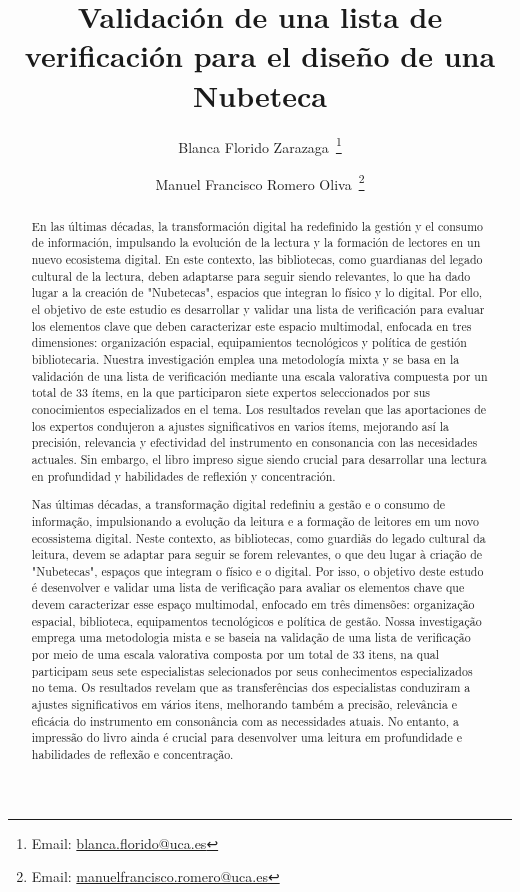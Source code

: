 \documentclass[spanish]{textolivre}
\title{Validación de una lista de verificación para el diseño de una Nubeteca}
\author[1]{Blanca Florido Zarazaga~\orcid{0000-0003-0865-380X}\thanks{Email: \href{mailto:blanca.florido@uca.es}{blanca.florido@uca.es}}}
\author[1]{Manuel Francisco Romero Oliva~\orcid{0000-0002-6854-0682}\thanks{Email: \href{mailto:manuelfrancisco.romero@uca.es}{manuelfrancisco.romero@uca.es}}}
\affil[1]{Universidad de Cádiz, Facultad de Ciencias de la Educación, Departamento de Didáctica de la Lengua y la Literatura, Cádiz, España.}
\begin{document}
\maketitle
\begin{polyabstract}
\begin{abstract}
En las últimas décadas, la transformación digital ha redefinido la gestión y el consumo de información, impulsando la evolución de la lectura y la formación de lectores en un nuevo ecosistema digital. En este contexto, las bibliotecas, como guardianas del legado cultural de la lectura, deben adaptarse para seguir siendo relevantes, lo que ha dado lugar a la creación de "Nubetecas", espacios que integran lo físico y lo digital. Por ello, el objetivo de este estudio es desarrollar y validar una lista de verificación para evaluar los elementos clave que deben caracterizar este espacio multimodal, enfocada en tres dimensiones: organización espacial, equipamientos tecnológicos y política de gestión bibliotecaria. Nuestra investigación emplea una metodología mixta y se basa en la validación de una lista de verificación mediante una escala valorativa compuesta por un total de 33 ítems, en la que participaron siete expertos seleccionados por sus conocimientos especializados en el tema. Los resultados revelan que las aportaciones de los expertos condujeron a ajustes significativos en varios ítems, mejorando así la precisión, relevancia y efectividad del instrumento en consonancia con las necesidades actuales. Sin embargo, el libro impreso sigue siendo crucial para desarrollar una lectura en profundidad y habilidades de reflexión y concentración.

\end{abstract}

\begin{abstract}
Nas últimas décadas, a transformação digital redefiniu a gestão e o consumo de informação, impulsionando a evolução da leitura e a formação de leitores em um novo ecossistema digital. Neste contexto, as bibliotecas, como guardiãs do legado cultural da leitura, devem se adaptar para seguir se forem relevantes, o que deu lugar à criação de "Nubetecas", espaços que integram o físico e o digital. Por isso, o objetivo deste estudo é desenvolver e validar uma lista de verificação para avaliar os elementos chave que devem caracterizar esse espaço multimodal, enfocado em três dimensões: organização espacial, biblioteca, equipamentos tecnológicos e política de gestão. Nossa investigação emprega uma metodologia mista e se baseia na validação de uma lista de verificação por meio de uma escala valorativa composta por um total de 33 itens, na qual participam seus sete especialistas selecionados por seus conhecimentos especializados no tema. Os resultados revelam que as transferências dos especialistas conduziram a ajustes significativos em vários itens, melhorando também a precisão, relevância e eficácia do instrumento em consonância com as necessidades atuais. No entanto, a impressão do livro ainda é crucial para desenvolver uma leitura em profundidade e habilidades de reflexão e concentração.


\end{abstract}
\end{polyabstract}
\end{document}
